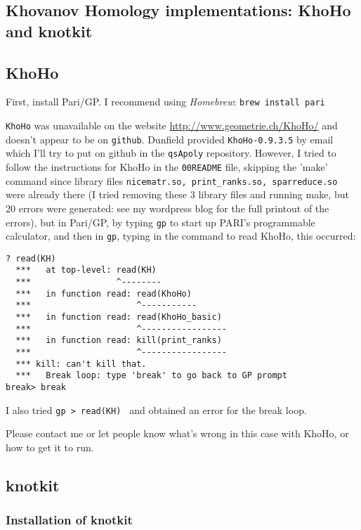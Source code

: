 \documentclass[10pt]{amsart}
\begin{document}
\begin{multicols*}{2}
\section{Khovanov Homology implementations: KhoHo and knotkit}

\subsection{KhoHo}

First, install Pari/GP.  I recommend using \emph{Homebrew}: \verb|brew install pari|

\verb|KhoHo| was unavailable on the website \url{http://www.geometrie.ch/KhoHo/} and doesn't appear to be on \verb|github|.  Dunfield provided \verb|KhoHo-0.9.3.5| by email which I'll try to put on github in the \verb|qsApoly| repository.  However, I tried to follow the instructions for KhoHo in the \verb|00README| file, skipping the 'make' command since library files \verb|nicematr.so, print_ranks.so, sparreduce.so| were already there (I tried removing these 3 library files and running make, but 20 errors were generated: see my wordpress blog for the full printout of the errors), but in Pari/GP, by typing \verb|gp| to start up PARI's programmable calculator, and then in \verb|gp|, typing in the command to read KhoHo, this occurred:
\begin{lstlisting}
? read(KH)
  ***   at top-level: read(KH)
  ***                 ^--------
  ***   in function read: read(KhoHo)
  ***                     ^-----------
  ***   in function read: read(KhoHo_basic)
  ***                     ^-----------------
  ***   in function read: kill(print_ranks)
  ***                     ^-----------------
  *** kill: can't kill that.
  ***   Break loop: type 'break' to go back to GP prompt
break> break
\end{lstlisting}
I also tried \verb|gp > read(KH) | and obtained an error for the break loop.  

Please contact me or let people know what's wrong in this case with KhoHo, or how to get it to run.  

\subsection{knotkit}

\subsubsection{Installation of knotkit}\label{Subsubsec:knotkitinstall}


\end{multicols*}
\end{document}
